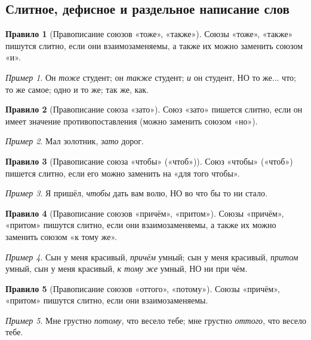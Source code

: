 \documentclass[12pt]{article}
\theoremstyle{definition}
\newtheorem{rrule}{Правило}[section]
\theoremstyle{remark}
\newtheorem*{example}{Пример}
\begin{document}
\subsection{Слитное, дефисное и раздельное написание слов}

\begin{rrule}[Правописание союзов «тоже», «также»]
    Союзы «тоже», «также» пишутся слитно, если они взаимозаменяемы, а также их можно заменить союзом «и».
    \begin{example}
        Он \textsl{тоже} студент; он \textsl{также} студент; \textsl{и} он студент, НО то же... что; то же самое; одно и то же; так же, как.
    \end{example}
\end{rrule}

\begin{rrule}[Правописание союза «зато»]
    Союз «зато» пишется слитно, если он имеет значение противопоставления (можно заменить союзом «но»).
    \begin{example}
        Мал золотник, \textsl{зато} дорог.
    \end{example}
\end{rrule}

\begin{rrule}[Правописание союза «чтобы» («чтоб»)]
    Союз «чтобы» («чтоб») пишется слитно, если его можно заменить на «для того чтобы».
    \begin{example}
        Я пришёл, \textsl{чтобы} дать вам волю, НО во что бы то ни стало.
    \end{example}
\end{rrule}

\begin{rrule}[Правописание союзов «причём», «притом»]
    Союзы «причём», «притом» пишутся слитно, если они взаимозаменяемы, а также их можно заменить союзом «к тому же».
    \begin{example}
        Сын у меня красивый, \textsl{причём} умный; сын у меня красивый, \textsl{притом} умный, сын у меня красивый, \textsl{к тому же} умный, НО ни при чём.
    \end{example}
\end{rrule}

\begin{rrule}[Правописание союзов «оттого», «потому»]
    Союзы «причём», «притом» пишутся слитно, если они взаимозаменяемы.
    \begin{example}
        Мне грустно \textsl{потому}, что весело тебе; мне грустно \textsl{оттого}, что весело тебе.
    \end{example}
\end{rrule}
\end{document}
